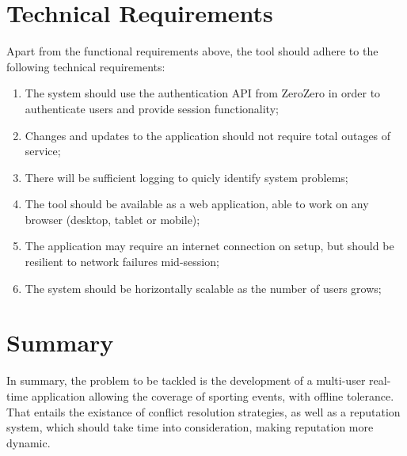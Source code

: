 \section{Technical Requirements}

Apart from the functional requirements above, the tool should adhere to the following technical requirements:

\begin{enumerate}[leftmargin  = 3.25\parindent, align=left, label=TR\arabic*, start=1]
    \item The system should use the authentication API from ZeroZero in order to authenticate users and provide session functionality;
    \item Changes and updates to the application should not require total outages of service;
    \item There will be sufficient logging to quicly identify system problems;
    \item The tool should be available as a web application, able to work on any browser (desktop, tablet or mobile);
    \item The application may require an internet connection on setup, but should be resilient to network failures mid-session;
    \item The system should be horizontally scalable as the number of users grows;
\end{enumerate}

\section{Summary}

In summary, the problem to be tackled is the development of a multi-user real-time application allowing the coverage of sporting events, with offline tolerance. That entails the existance of conflict resolution strategies, as well as a reputation system, which should take time into consideration, making reputation more dynamic.

